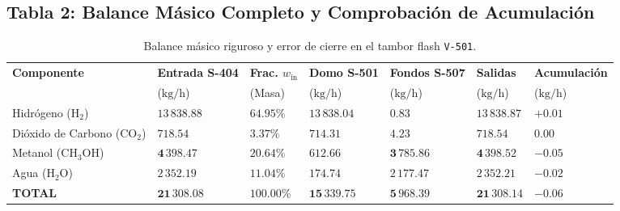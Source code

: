 \documentclass[11pt,letterpaper]{article}
\begin{document}
\subsection{Tabla 2: Balance Másico Completo y Comprobación de Acumulación}
\begin{table}[H]
\centering
\small
\setlength{\tabcolsep}{3pt}
\begin{tabularx}{\textwidth}{>{\raggedright\arraybackslash}p{3.5cm} >{\raggedleft\arraybackslash}X >{\centering\arraybackslash}p{1.6cm} >{\raggedleft\arraybackslash}X >{\raggedleft\arraybackslash}X >{\raggedleft\arraybackslash}X >{\raggedleft\arraybackslash}p{2.3cm}}
\toprule
\textbf{Componente} & \textbf{Entrada S-404} & \textbf{Frac. $w_{\text{in}}$} & \textbf{Domo S-501} & \textbf{Fondos S-507} & \textbf{Salidas} & \textbf{Acumulación} \\
 & ($\text{kg/h}$) & (Masa) & ($\text{kg/h}$) & ($\text{kg/h}$) & ($\text{kg/h}$) & ($\text{kg/h}$) \\
\midrule
Hidrógeno ($\text{H}_2$) & $13\,838.88$ & $64.95\%$ & $13\,838.04$ & $0.83$ & $13\,838.87$ & $\mathbf{+0.01}$ \\
Dióxido de Carbono ($\text{CO}_2$) & $718.54$ & $3.37\%$ & $714.31$ & $4.23$ & $718.54$ & $\mathbf{0.00}$ \\
Metanol ($\text{CH}_3\text{OH}$) & $\mathbf{4\,398.47}$ & $\mathbf{20.64\%}$ & $612.66$ & $\mathbf{3\,785.86}$ & $\mathbf{4\,398.52}$ & $\mathbf{-0.05}$ \\
Agua ($\text{H}_2\text{O}$) & $2\,352.19$ & $11.04\%$ & $174.74$ & $2\,177.47$ & $2\,352.21$ & $\mathbf{-0.02}$ \\
\midrule
\textbf{TOTAL} & $\mathbf{21\,308.08}$ & $\mathbf{100.00\%}$ & $\mathbf{15\,339.75}$ & $\mathbf{5\,968.39}$ & $\mathbf{21\,308.14}$ & $\mathbf{-0.06}$ \\
\bottomrule
\end{tabularx}
\caption{Balance másico riguroso y error de cierre en el tambor flash \texttt{V-501}.}
\end{table}

\vspace{-0.1cm}
\end{document}
